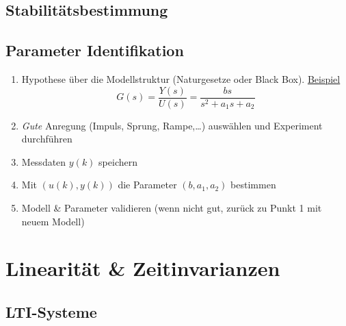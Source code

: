 \documentclass[
  10pt,
  a4paper,
  twocolumn]{article}
\newcommand{\VERB}{\Verb[commandchars=\\\{\}]}
\newcommand{\NormalTok}[1]{\textcolor[rgb]{0.14,0.16,0.18}{#1}}
\newcommand{\OperatorTok}[1]{\textcolor[rgb]{0.14,0.16,0.18}{#1}}
\newcommand{\VariableTok}[1]{\textcolor[rgb]{0.89,0.38,0.04}{#1}}
\providecommand{\tightlist}{%
  \setlength{\itemsep}{0pt}\setlength{\parskip}{0pt}}\usepackage{longtable,booktabs,array}
\numberwithin{equation}{section}
\begin{document}
\hypertarget{stabilituxe4tsbestimmung}{%
\subsection{Stabilitätsbestimmung}\label{stabilituxe4tsbestimmung}}


\hypertarget{parameter-identifikation}{%
\subsection{Parameter Identifikation}\label{parameter-identifikation}}

\begin{enumerate}
\def\labelenumi{\arabic{enumi}.}
\tightlist
\item
  Hypothese über die Modellstruktur (Naturgesetze oder Black Box).
  \ul{Beispiel} \[
  G(s)=\frac{Y(s)}{U(s)}=\frac{bs}{s^2+a_1s+a_2}
  \]
\item
  \emph{Gute} Anregung (Impuls, Sprung, Rampe,\ldots) auswählen und
  Experiment durchführen
\item
  Messdaten \(y(k)\) speichern
\item
  Mit \((u(k), y(k))\) die Parameter \((b, a_1, a_2)\) bestimmen
\item
  Modell \& Parameter validieren (wenn nicht gut, zurück zu Punkt 1 mit
  neuem Modell)
\end{enumerate}

\hypertarget{linearituxe4t-zeitinvarianzen}{%
\section{Linearität \&
Zeitinvarianzen}\label{linearituxe4t-zeitinvarianzen}}

\hypertarget{lti-systeme}{%
\subsection{LTI-Systeme}\label{lti-systeme}}
\end{document}
